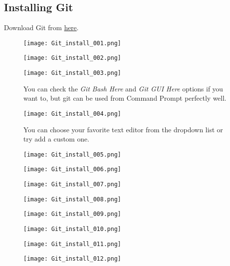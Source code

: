 \begin{appendices}
\subsection{Installing Git}
Download Git from \href{https://git-scm.com/download/win}{here}.
\begin{figure}[!htb]
	\centering
	\texttt{[image: Git\_install\_001.png]}
\end{figure}
\begin{figure}[!htb]
	\centering
	\texttt{[image: Git\_install\_002.png]}
\end{figure}
\begin{figure}[!htb]
	\centering
	\texttt{[image: Git\_install\_003.png]}
	\caption{You can check the \textit{Git Bash Here} and \textit{Git GUI Here} options if you want to, but git can be used from Command Prompt perfectly well.}
\end{figure}
\begin{figure}[!htb]
	\centering
	\texttt{[image: Git\_install\_004.png]}
	\caption{You can choose your favorite text editor from the dropdown list or try add a custom one.}
\end{figure}
\begin{figure}[!htb]
	\centering
	\texttt{[image: Git\_install\_005.png]}
\end{figure}
\begin{figure}[!htb]
	\centering
	\texttt{[image: Git\_install\_006.png]}
\end{figure}
\begin{figure}[!htb]
	\centering
	\texttt{[image: Git\_install\_007.png]}
\end{figure}
\begin{figure}[!htb]
	\centering
	\texttt{[image: Git\_install\_008.png]}
\end{figure}
\begin{figure}[!htb]
	\centering
	\texttt{[image: Git\_install\_009.png]}
\end{figure}
\begin{figure}[!htb]
	\centering
	\texttt{[image: Git\_install\_010.png]}
\end{figure}
\begin{figure}[!htb]
	\centering
	\texttt{[image: Git\_install\_011.png]}
\end{figure}
\begin{figure}[!htb]
	\centering
	\texttt{[image: Git\_install\_012.png]}
\end{figure}


\end{appendices}
